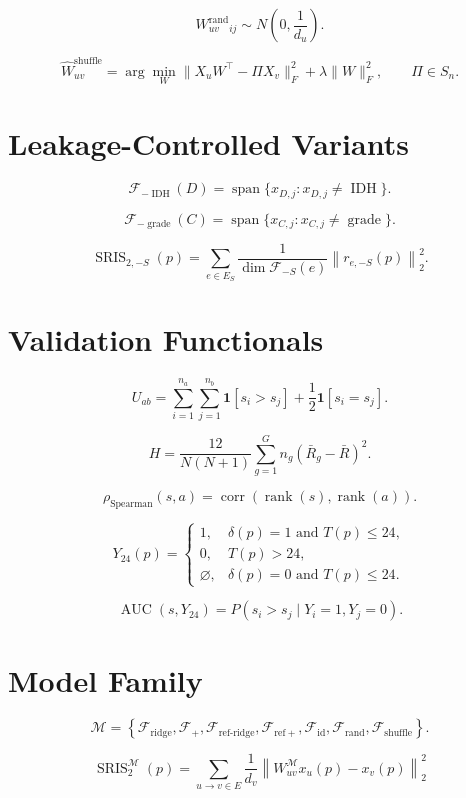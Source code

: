 \documentclass[11pt]{article}
\begin{document}
\[
W_{uv}^{\mathrm{rand}}{}_{ij}\sim N\left(0,\frac{1}{d_u}\right).
\]

\[
\widehat W_{uv}^{\mathrm{shuffle}}
=
\arg\min_W
\|X_uW^\top-\Pi X_v\|_F^2+
\lambda\|W\|_F^2,
\qquad
\Pi\in S_n.
\]

\section*{Leakage-Controlled Variants}

\[
\mathcal F_{-\operatorname{IDH}}(D)
=\operatorname{span}\{x_{D,j}:x_{D,j}\ne \operatorname{IDH}\}.
\]

\[
\mathcal F_{-\operatorname{grade}}(C)
=\operatorname{span}\{x_{C,j}:x_{C,j}\ne \operatorname{grade}\}.
\]

\[
\operatorname{SRIS}_{2,-S}(p)
=\sum_{e\in E_S}\frac{1}{\dim\mathcal F_{-S}(e)}
\left\|r_{e,-S}(p)\right\|_2^2.
\]

\section*{Validation Functionals}

\[
U_{ab}=\sum_{i=1}^{n_a}\sum_{j=1}^{n_b}\mathbf 1[s_i>s_j]
+\frac{1}{2}\mathbf 1[s_i=s_j].
\]

\[
H=\frac{12}{N(N+1)}\sum_{g=1}^{G}n_g(\bar R_g-\bar R)^2.
\]

\[
\rho_{\mathrm{Spearman}}(s,a)
=\operatorname{corr}(\operatorname{rank}(s),\operatorname{rank}(a)).
\]

\[
Y_{24}(p)=
\begin{cases}
1,&\delta(p)=1\text{ and }T(p)\le 24,\\
0,&T(p)>24,\\
\varnothing,&\delta(p)=0\text{ and }T(p)\le 24.
\end{cases}
\]

\[
\operatorname{AUC}(s,Y_{24})
=P(s_i>s_j\mid Y_i=1,Y_j=0).
\]

\section*{Model Family}

\[
\mathcal M=
\left\{
\mathcal F_{\mathrm{ridge}},
\mathcal F_{+},
\mathcal F_{\mathrm{ref\text{-}ridge}},
\mathcal F_{\mathrm{ref}+},
\mathcal F_{\mathrm{id}},
\mathcal F_{\mathrm{rand}},
\mathcal F_{\mathrm{shuffle}}
\right\}.
\]

\[
\boxed{
\operatorname{SRIS}_{2}^{\mathcal M}(p)
=
\sum_{u\to v\in E}\frac{1}{d_v}
\left\|W_{uv}^{\mathcal M}x_u(p)-x_v(p)\right\|_2^2
}
\]
\end{document}
